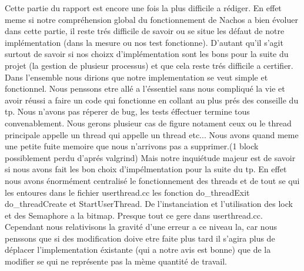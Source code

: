 \documentclass[10pt]{article}
\begin{document}
Cette partie du rapport est encore une fois la plus difficile a rédiger. En effet
meme si notre compréhension global du fonctionnement de Nachos a bien évoluer dans
cette partie, il reste trés difficile de savoir ou se situe les défaut de notre
implémentation (dans la mesure ou nos test fonctionne). D'autant qu'il s'agit surtout
de savoir si nos choizx d'implémentation sont les bons pour la suite du projet (la gestion
de plusieur processus) et que cela reste trés difficile a certifier.
\newline
\newline
Dans l'ensemble nous dirions que notre implementation se veut simple et fonctionnel.
Nous penssons etre allé a l'éssentiel sans nous compliqué la vie et avoir réussi a faire
un code qui fonctionne en collant au plus prés des conseille du tp.
Nous n'avons pas réperer de bug, les tests éffectuer termine tous convenablement. Nous gerons plusieur
cas de figure notament ceux ou le thread principale appelle un thread qui appelle un thread
etc...
\newline
\newline
Nous avons quand meme une petite fuite memoire que nous n'arrivons pas a
supprimer.(1 block possiblement perdu d'aprés valgrind)
Mais notre inquiétude majeur est de savoir si nous avons fait les bon choix d'impélmentation
pour la suite du tp. En effet nous avons énormément centralisé le fonctionnement des
threads et de tout se qui les entoures dans le fichier userthread.cc les fonction do\_threadExit
do\_threadCreate et StartUserThread.
De l'instanciation et l'utilisation des lock et des Semaphore a la bitmap. Presque tout
ce gere dans userthread.cc.
\newline
\newline
Cependant nous relativisons la gravité d'une erreur a ce niveau la, car nous penssons que si
des modification doive etre faite plus tard il s'agira plus de déplacer l'implementation éxistante
(qui a notre avis est bonne) que de la modifier se qui ne représente pas la mème quantité de travail.
\end{document}
